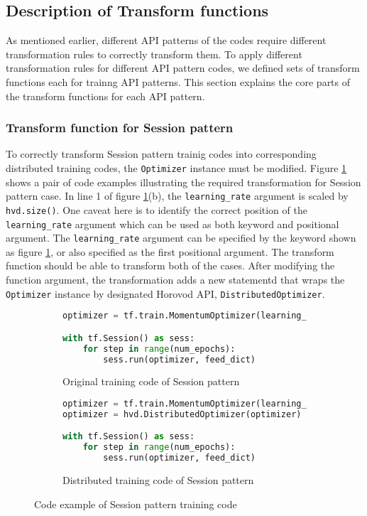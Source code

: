 \subsection{Description of Transform functions}

As mentioned earlier, different API patterns of the codes
require different transformation rules to correctly transform them.
To apply different transformation rules for different API pattern codes,
we defined sets of transform functions each for trainng API patterns.
This section explains the core parts of the transform functions 
for each API pattern.

\subsubsection{Transform function for Session pattern}

To correctly transform Session pattern trainig codes into corresponding
distributed training codes, the {\tt Optimizer} instance must be modified.
Figure \ref{fig:trans:sessiontrans} shows a pair of code examples
illustrating the required transformation for Session pattern case.
In line 1 of figure \ref{fig:trans:sessiontrans}(b),
the {\tt learning\_rate} argument is scaled by {\tt hvd.size()}.
One caveat here is to identify the correct position of the {\tt learning\_rate}
argument which can be used as both keyword and positional argument.
The {\tt learning\_rate} argument can be specified by the keyword shown as
figure \ref{fig:trans:sessiontrans}, or also specified as the first
positional argument.
The transform function should be able to transform both of the cases.
After modifying the function argument,
the transformation adds a new statementd that wraps the {\tt Optimizer} instance
by designated Horovod API, {\tt DistributedOptimizer}.

\begin{figure}[ht!]
  \begin{subfigure}[t]{0.45\textwidth}
    \begin{lstlisting}[language=Python]
optimizer = tf.train.MomentumOptimizer(learning_rate = 0.01)

with tf.Session() as sess:
    for step in range(num_epochs): 
        sess.run(optimizer, feed_dict)
    \end{lstlisting}
    \caption{Original training code of Session pattern}
  \end{subfigure}
  \hspace{5mm}
  \begin{subfigure}[t]{0.45\textwidth}
    \begin{lstlisting}[language=Python]
optimizer = tf.train.MomentumOptimizer(learning_rate = 0.01 * hvd.size())
optimizer = hvd.DistributedOptimizer(optimizer)

with tf.Session() as sess:
    for step in range(num_epochs): 
        sess.run(optimizer, feed_dict)
    \end{lstlisting}
    \caption{Distributed training code of Session pattern}
  \end{subfigure}
  \caption{Code example of Session pattern training code}
  \label{fig:trans:sessiontrans}
\end{figure}

